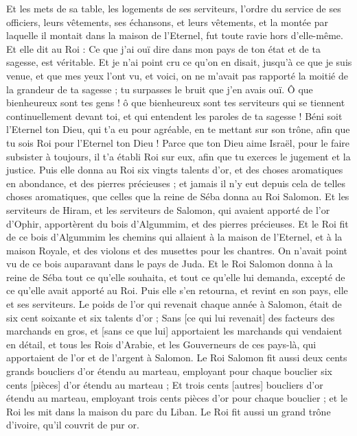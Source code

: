 \begin{multicols}{2}
Et les mets de sa table, les logements de ses serviteurs, l'ordre du service de ses officiers, leurs vêtements, ses échansons, et leurs vêtements, et la montée par laquelle il montait dans la maison de l'Eternel, fut toute ravie hors d'elle-même.
Et elle dit au Roi : Ce que j'ai ouï dire dans mon pays de ton état et de ta sagesse, est véritable.
Et je n'ai point cru ce qu'on en disait, jusqu'à ce que je suis venue, et que mes yeux l'ont vu, et voici, on ne m'avait pas rapporté la moitié de la grandeur de ta sagesse ; tu surpasses le bruit que j'en avais ouï.
Ô que bienheureux sont tes gens ! ô que bienheureux sont tes serviteurs qui se tiennent continuellement devant toi, et qui entendent les paroles de ta sagesse !
Béni soit l'Eternel ton Dieu, qui t'a eu pour agréable, en te mettant sur son trône, afin que tu sois Roi pour l'Eternel ton Dieu ! Parce que ton Dieu aime Israël, pour le faire subsister à toujours, il t'a établi Roi sur eux, afin que tu exerces le jugement et la justice.
Puis elle donna au Roi six vingts talents d'or, et des choses aromatiques en abondance, et des pierres précieuses ; et jamais il n'y eut depuis cela de telles choses aromatiques, que celles que la reine de Séba donna au Roi Salomon.
Et les serviteurs de Hiram, et les serviteurs de Salomon, qui avaient apporté de l'or d'Ophir, apportèrent du bois d'Algummim, et des pierres précieuses.
Et le Roi fit de ce bois d'Algummim les chemins qui allaient à la maison de l'Eternel, et à la maison Royale, et des violons et des musettes pour les chantres. On n'avait point vu de ce bois auparavant dans le pays de Juda.
Et le Roi Salomon donna à la reine de Séba tout ce qu'elle souhaita, et tout ce qu'elle lui demanda, excepté de ce qu'elle avait apporté au Roi. Puis elle s'en retourna, et revint en son pays, elle et ses serviteurs.
Le poids de l'or qui revenait chaque année à Salomon, était de six cent soixante et six talents d'or ;
Sans [ce qui lui revenait] des facteurs des marchands en gros, et [sans ce que lui] apportaient les marchands qui vendaient en détail, et tous les Rois d'Arabie, et les Gouverneurs de ces pays-là, qui apportaient de l'or et de l'argent à Salomon.
Le Roi Salomon fit aussi deux cents grands boucliers d'or étendu au marteau, employant pour chaque bouclier six cents [pièces] d'or étendu au marteau ;
Et trois cents [autres] boucliers d'or étendu au marteau, employant trois cents pièces d'or pour chaque bouclier ; et le Roi les mit dans la maison du parc du Liban.
Le Roi fit aussi un grand trône d'ivoire, qu'il couvrit de pur or.

\end{multicols}
